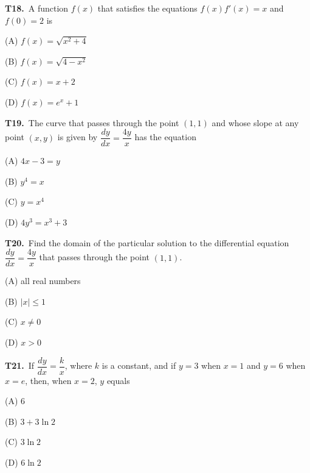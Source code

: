 \documentclass[11pt]{article}
\begin{document}
\bigskip\noindent\textbf{T18.}\ A function $f(x)$ that satisfies the equations $f(x)f'(x)=x$ and $f(0)=2$ is
\begin{list}{}{\setlength{\leftmargin}{3em}\setlength{\labelwidth}{2.5em}\setlength{\itemsep}{0pt}\setlength{\topsep}{2pt}}
\item[(A)] $f(x)=\sqrt{x^2+4}$
\item[(B)] $f(x)=\sqrt{4-x^2}$
\item[(C)] $f(x)=x+2$
\item[(D)] $f(x)=e^x+1$
\end{list}

\bigskip\noindent\textbf{T19.}\ The curve that passes through the point $(1,1)$ and whose slope at any point $(x,y)$ is given by $\dfrac{dy}{dx}=\dfrac{4y}{x}$ has the equation
\begin{list}{}{\setlength{\leftmargin}{3em}\setlength{\labelwidth}{2.5em}\setlength{\itemsep}{0pt}\setlength{\topsep}{2pt}}
\item[(A)] $4x-3=y$
\item[(B)] $y^4=x$
\item[(C)] $y=x^4$
\item[(D)] $4y^3=x^3+3$
\end{list}

\bigskip\noindent\textbf{T20.}\ Find the domain of the particular solution to the differential equation $\dfrac{dy}{dx}=\dfrac{4y}{x}$ that passes through the point $(1,1)$.
\begin{list}{}{\setlength{\leftmargin}{3em}\setlength{\labelwidth}{2.5em}\setlength{\itemsep}{0pt}\setlength{\topsep}{2pt}}
\item[(A)] all real numbers
\item[(B)] $|x|\leq 1$
\item[(C)] $x\neq 0$
\item[(D)] $x>0$
\end{list}

\bigskip\noindent\textbf{T21.}\ If $\dfrac{dy}{dx}=\dfrac{k}{x}$, where $k$ is a constant, and if $y=3$ when $x=1$ and $y=6$ when $x=e$, then, when $x=2$, $y$ equals
\begin{list}{}{\setlength{\leftmargin}{3em}\setlength{\labelwidth}{2.5em}\setlength{\itemsep}{0pt}\setlength{\topsep}{2pt}}
\item[(A)] $6$
\item[(B)] $3+3\ln 2$
\item[(C)] $3\ln 2$
\item[(D)] $6\ln 2$
\end{list}
\end{document}
